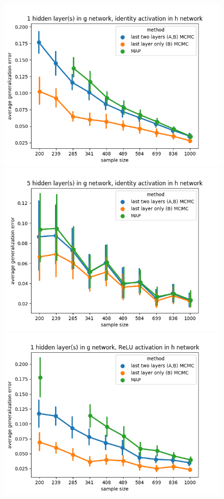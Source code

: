 \documentclass{article} %
\begin{document}
\newpage
\begin{figure}[t!]
	\begin{center}
		\includegraphics[scale=0.35]{taskid4.png}
		\includegraphics[scale=0.35]{taskid5.png}
		\includegraphics[scale=0.35]{taskid6.png}

\end{center}
\end{figure}
\end{document}

